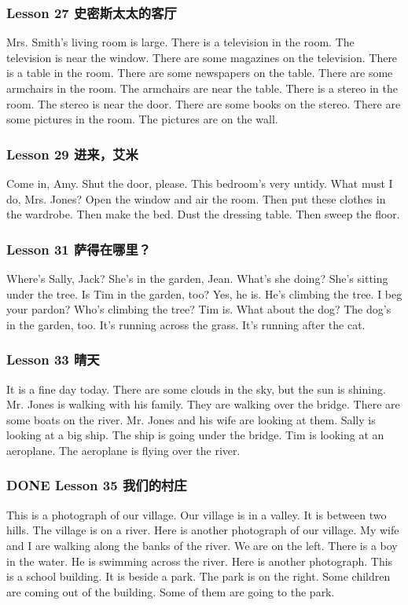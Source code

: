 \documentclass[11pt]{ctexart}
\begin{document}
\subsubsection{Lesson 27 史密斯太太的客厅}
\label{sec:org94e9079}
Mrs. Smith's living room is large.
There is a television in the room.
The television is near the window.
There are some magazines on the television.
There is a table in the room.
There are some newspapers on the table.
There are some armchairs in the room.
The armchairs are near the table.
There is a stereo in the room.
The stereo is near the door.
There are some books on the stereo.
There are some pictures in the room.
The pictures are on the wall.
\subsubsection{Lesson 29 进来，艾米}
\label{sec:orgfbe2b46}
Come in, Amy.
Shut the door, please.
This bedroom's very untidy.
What must I do, Mrs. Jones?
Open the window and air the room.
Then put these clothes in the wardrobe.
Then make the bed.
Dust the dressing table.
Then sweep the floor.

\subsubsection{Lesson 31 萨得在哪里？}
\label{sec:org6072f7b}
Where's Sally, Jack?
She's in the garden, Jean.
What's she doing?
She's sitting under the tree.
Is Tim in the garden, too?
Yes, he is.
He's climbing the tree.
I beg your pardon?
Who's climbing the tree?
Tim is.
What about the dog?
The dog's in the garden, too.
It's running across the grass.
It's running after the cat.

\subsubsection{Lesson 33 晴天}
\label{sec:org5e3a686}
It is a fine day today.
There are some clouds in the sky,
but the sun is shining.
Mr. Jones is walking with his family.
They are walking over the bridge.
There are some boats on the river.
Mr. Jones and his wife are looking at them.
Sally is looking at a big ship.
The ship is going under the bridge.
Tim is looking at an aeroplane.
The aeroplane is flying over the river.
\subsubsection{{\bfseries\sffamily DONE} Lesson 35 我们的村庄}
\label{sec:org4b463d3}
This is a photograph of our village.
Our village is in a valley.
It is between two hills.
The village is on a river.
Here is another photograph of our village.
My wife and I are walking along the banks of the river.
We are on the left.
There is a boy in the water.
He is swimming across the river.
Here is another photograph.
This is a school building.
It is beside a park.
The park is on the right.
Some children are coming out of the building.
Some of them are going to the park.
\end{document}
